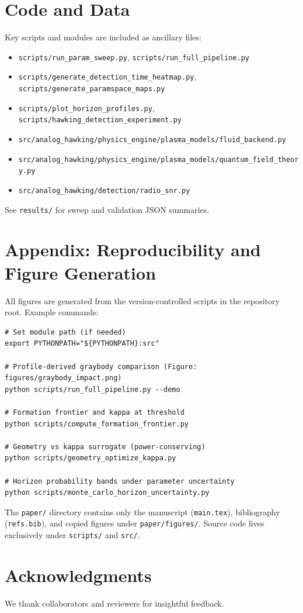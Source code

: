 \documentclass[11pt]{article}
\begin{document}
\section{Code and Data}
Key scripts and modules are included as ancillary files:
\begin{itemize}
  \item \texttt{scripts/run\_param\_sweep.py}, \texttt{scripts/run\_full\_pipeline.py}
  \item \texttt{scripts/generate\_detection\_time\_heatmap.py}, \texttt{scripts/generate\_paramspace\_maps.py}
  \item \texttt{scripts/plot\_horizon\_profiles.py}, \texttt{scripts/hawking\_detection\_experiment.py}
  \item \texttt{src/analog\_hawking/physics\_engine/plasma\_models/fluid\_backend.py}
  \item \texttt{src/analog\_hawking/physics\_engine/plasma\_models/quantum\_field\_theory.py}
  \item \texttt{src/analog\_hawking/detection/radio\_snr.py}
\end{itemize}
See \texttt{results/} for sweep and validation JSON summaries.

\section*{Appendix: Reproducibility and Figure Generation}
All figures are generated from the version-controlled scripts in the repository root. Example commands:
\begin{verbatim}
# Set module path (if needed)
export PYTHONPATH="${PYTHONPATH}:src"

# Profile-derived graybody comparison (Figure: figures/graybody_impact.png)
python scripts/run_full_pipeline.py --demo

# Formation frontier and kappa at threshold
python scripts/compute_formation_frontier.py

# Geometry vs kappa surrogate (power-conserving)
python scripts/geometry_optimize_kappa.py

# Horizon probability bands under parameter uncertainty
python scripts/monte_carlo_horizon_uncertainty.py
\end{verbatim}
The \texttt{paper/} directory contains only the manuscript (\texttt{main.tex}), bibliography (\texttt{refs.bib}), and copied figures under \texttt{paper/figures/}. Source code lives exclusively under \texttt{scripts/} and \texttt{src/}.

\section*{Acknowledgments}
We thank collaborators and reviewers for insightful feedback.



\end{document}
